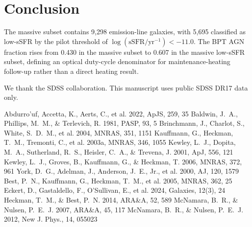 \documentclass[twocolumn]{aastex631}
\begin{document}
\section{Conclusion}\label{sec:conclusion}
The massive subset contains 9,298 emission-line galaxies, with 5,695 classified as low-sSFR by the pilot threshold of $\log(\mathrm{sSFR}/\mathrm{yr}^{-1}) < -11.0$. The BPT AGN fraction rises from 0.430 in the massive subset to 0.607 in the massive low-sSFR subset, defining an optical duty-cycle denominator for maintenance-heating follow-up rather than a direct heating result.

\acknowledgments
We thank the SDSS collaboration. This manuscript uses public SDSS DR17 data only.


\begin{thebibliography}{}
 Abdurro'uf, Accetta, K., Aerts, C., et al. 2022, ApJS, 259, 35
 Baldwin, J.~A., Phillips, M.~M., \& Terlevich, R. 1981, PASP, 93, 5
 Brinchmann, J., Charlot, S., White, S.~D.~M., et al. 2004, MNRAS, 351, 1151
 Kauffmann, G., Heckman, T.~M., Tremonti, C., et al. 2003a, MNRAS, 346, 1055
 Kewley, L.~J., Dopita, M.~A., Sutherland, R.~S., Heisler, C.~A., \& Trevena, J. 2001, ApJ, 556, 121
 Kewley, L.~J., Groves, B., Kauffmann, G., \& Heckman, T. 2006, MNRAS, 372, 961
 York, D.~G., Adelman, J., Anderson, J.~E., Jr., et al. 2000, AJ, 120, 1579
 Best, P.~N., Kauffmann, G., Heckman, T.~M., et al. 2005, MNRAS, 362, 25
 Eckert, D., Gastaldello, F., O'Sullivan, E., et al. 2024, Galaxies, 12(3), 24
 Heckman, T.~M., \& Best, P.~N. 2014, ARA\&A, 52, 589
 McNamara, B.~R., \& Nulsen, P.~E.~J. 2007, ARA\&A, 45, 117
 McNamara, B.~R., \& Nulsen, P.~E.~J. 2012, New J. Phys., 14, 055023
\end{thebibliography}
\end{document}
